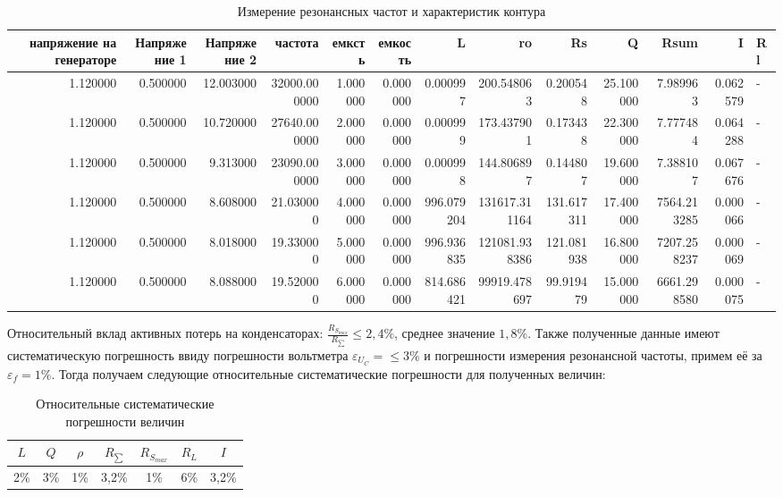 \documentclass[a4paper, 12pt]{article}
\begin{document}
    \begin{table}[h!]
        \begin{tabular}{rrrrrrrrrrrrl}
            \toprule
            напряжение на генераторе & Напряжение 1 & Напряжение 2 & частота & емксть & емкость & L & ro & Rs & Q & Rsum & I & Rl \\
            \midrule
            1.120000 & 0.500000 & 12.003000 & 32000.000000 & 1.000000 & 0.000000 & 0.000997 & 200.548063 & 0.200548 & 25.100000 & 7.989963 & 0.062579 & - \\
            1.120000 & 0.500000 & 10.720000 & 27640.000000 & 2.000000 & 0.000000 & 0.000999 & 173.437901 & 0.173438 & 22.300000 & 7.777484 & 0.064288 & - \\
            1.120000 & 0.500000 & 9.313000 & 23090.000000 & 3.000000 & 0.000000 & 0.000998 & 144.806897 & 0.144807 & 19.600000 & 7.388107 & 0.067676 & - \\
            1.120000 & 0.500000 & 8.608000 & 21.030000 & 4.000000 & 0.000000 & 996.079204 & 131617.311164 & 131.617311 & 17.400000 & 7564.213285 & 0.000066 & - \\
            1.120000 & 0.500000 & 8.018000 & 19.330000 & 5.000000 & 0.000000 & 996.936835 & 121081.938386 & 121.081938 & 16.800000 & 7207.258237 & 0.000069 & - \\
            1.120000 & 0.500000 & 8.088000 & 19.520000 & 6.000000 & 0.000000 & 814.686421 & 99919.478697 & 99.919479 & 15.000000 & 6661.298580 & 0.000075 & - \\
            \bottomrule
            \end{tabular}
	\caption{Измерение резонансных частот и характеристик контура}
	\end{table}

    Относительный вклад активных потерь на конденсаторах: $\frac{R_{S_{max}}}{R_{\sum}} \leq 2,4 \% $, среднее значение $1,8 \%$. Также полученные данные имеют систематическую погрешность ввиду погрешности вольтметра $\varepsilon_{U_C} = \leq 3\%$ и погрешности измерения резонансной частоты, примем её за $\varepsilon_f = 1 \%$. Тогда получаем следующие относительные систематические погрешности для полученных величин:
	\begin{table}[h!]
		\centering
		\begin{tabular}{|c|c|c|c|c|c|c|}
			\hline
			$L$ & $Q$ & $\rho$ & $R_{\sum}$ & $R_{S_{max}}$ & $R_L$ & $I$ \\ \hline
			2\% & 3\% & 1\% & 3,2\% & 1\% & 6\% & 3,2\% \\ \hline
		\end{tabular}
		\caption{Относительные систематические погрешности величин}
	\end{table}
\end{document}
